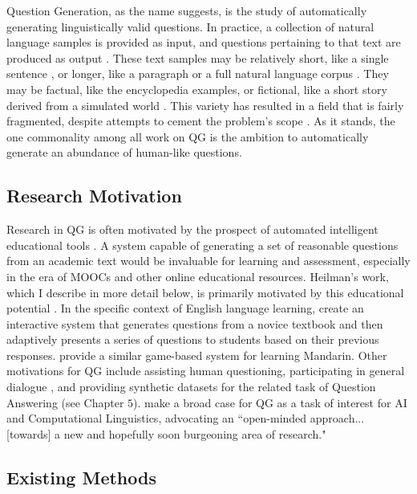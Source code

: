 Question Generation, as the name suggests, is the study of automatically generating linguistically valid questions. In practice, a collection of natural language samples is provided as input, and questions pertaining to that text are produced as output \citep{rus2011question, heilman2011automatic}. These text samples may be relatively short, like a single sentence \citep{ali2010automatic, rus2011question}, or longer, like a paragraph \citep{mannem2010question} or a full natural language corpus \citep{heilman2011automatic}. They may be factual, like the encyclopedia examples, or fictional, like a short story derived from a simulated world \citep{weston2015towards}. This variety has resulted in a field that is fairly fragmented, despite attempts to cement the problem's scope \citep{piwek2008generating}. As it stands, the one commonality among all work on QG is the ambition to automatically generate an abundance of human-like questions. 
 
\subsection{Research Motivation}

Research in QG is often motivated by the prospect of automated intelligent educational tools \citep{graesser2005scaffolding, heilman2011automatic}. A system capable of generating a set of reasonable questions from an academic text would be invaluable for learning and assessment, especially in the era of MOOCs and other online educational resources. Heilman's work, which I describe in more detail below, is primarily motivated by this educational potential \citep{heilman2011automatic}. In the specific context of English language learning, \citet{kunichika2004automated} create an interactive system that generates questions from a novice textbook and then adaptively presents a series of questions to students based on their previous responses. \citet{xu2009automatic} provide a similar game-based system for learning Mandarin. Other motivations for QG include assisting human questioning, participating in general dialogue \citep{walker2001spot}, and providing synthetic datasets for the related task of Question Answering (see Chapter $5$). \citet{piwek2008generating} make a broad case for QG as a task of interest for AI and Computational Linguistics, advocating an ``open-minded approach... [towards] a new and hopefully soon burgeoning area of research."

\subsection{Existing Methods}

